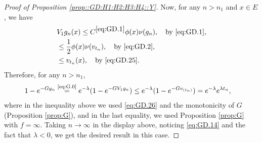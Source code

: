 \documentclass[12pt,a4paper]{amsart}
\numberwithin{equation}{section}
\theoremstyle{plain}
\theoremstyle{definition}
\theoremstyle{remark}
\begin{document}
\begin{proof}[Proof of Proposition \ref{prop::GD:H1:H2:H3:H4::Y}]
	Now, for any $n>n_1$ and $x\in E$, we have
\begin{align}
	& V_1g_n(x) \leq C^{\eqref{eq:GD.1}} \phi(x)\nu(g_n),\quad\text{by \eqref{eq:GD.1}},
	\\& \leq \frac{1}{2}\phi(x)\nu(v_{t_n}),\quad\text{by \eqref{eq:GD.2}},
	\\\label{eq:GD.26} & \leq v_{t_n}(x),\quad\text{by \eqref{eq:GD.25}}.
\end{align}
	Therefore, for any $n>n_1$,
\begin{align}
	& 1 - e^{- Gg_n}
	\overset{\text{\eqref{eq:G.0}}}= e^{- \lambda} (1- e^{- GV_1g_n})
	\leq e^{- \lambda} (1- e^{- G v_{(t_n)}})
	= e^{- \lambda} e^{\lambda t_n},
\end{align}
	where in the inequality above we used \eqref{eq:GD.26} and the monotonicity of $G$ (Proposition \ref{prop:G}), and in the last equality, we used Proposition \ref{prop:G} with $f = \infty$.
	Taking $n\to \infty$ in the display above, noticing \eqref{eq:GD.14} and the fact that $\lambda < 0$, 
	we get the desired result in this case.


\end{proof}
\end{document}
